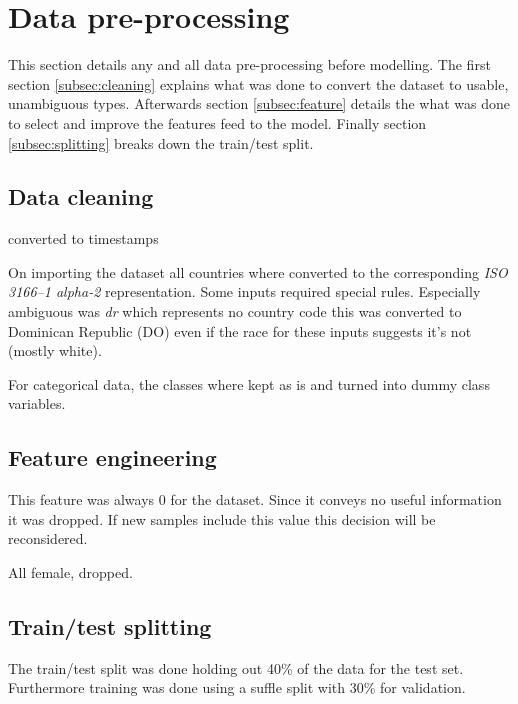 \section{Data pre-processing}
\label{sec:data}

This section details any and all data pre-processing before modelling.
The first section \vref{subsec:cleaning} explains what was done to
convert the dataset to usable, unambiguous types.
Afterwards section \vref{subsec:feature} details the what was
done to select and improve the features feed to the model.
Finally section \vref{subsec:splitting} breaks down the train/test split.


\subsection{Data cleaning}
\label{subsec:cleaning}

converted to timestamps


On importing the dataset all countries where converted
to the corresponding \emph{ISO 3166--1 alpha-2} representation.
Some inputs required special rules.
Especially ambiguous was \emph{dr} which
represents no country code this was converted to Dominican Republic (DO)
even if the race for these inputs suggests it's not (mostly white).

For categorical data, the classes where kept as is and turned into dummy class
variables.



\subsection{Feature engineering}
\label{subsec:feature}

This feature was always 0 for the dataset.
Since it conveys no useful information it was dropped.
If new samples include this value this decision will be reconsidered.

All female, dropped.



\subsection{Train/test splitting}
\label{subsec:splitting}

The train/test split was done holding out 40\% of the data for the test set.
Furthermore training was done using a suffle split with 30\% for validation.
